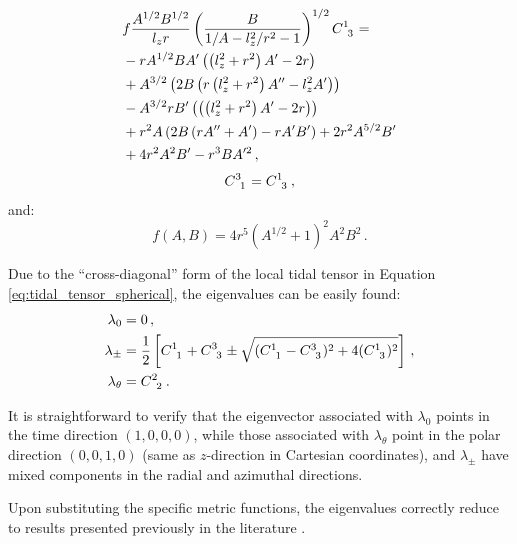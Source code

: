 \documentclass[
    reprint,
    prd,
    nofootinbib,
    amsmath,amssymb,
    aps,
    floatfix,
]{revtex4-2}
\begin{document}
\begin{equation}
    \begin{split}
        &f \frac{A^{1/2}B^{1/2}}{l_{z} r} \left( \frac{B}{1/A - l_{z}^{2}/r^{2} - 1} \right)^{1/2} \tensor{C}{^{1}_{3}} = \\
        &- r A^{1/2} B A' \left( \left( l_{z}^{2} + r^{2} \right) A' - 2 r \right) \\
        &+ A^{3/2} \left( 2 B \left( r \left( l_{z}^{2} + r^{2} \right) A'' - l_{z}^{2} A' \right) \right) \\
        &- A^{3/2} r B' \left( \left( \left( l_{z}^{2} + r^{2} \right) A' - 2 r \right) \right)  \\
        &+ r^{2} A \left( 2 B \left( r A'' + A' \right) - r A' B' \right) + 2 r^{2} A^{5/2} B' \\
        &+ 4 r^{2} A^{2} B' - r^3 B A'^{2} \, ,
    \end{split}
\end{equation}
\begin{equation}
    \tensor{C}{^{3}_{1}} = \tensor{C}{^{1}_{3}} \, ,
\end{equation}
and:
\begin{equation}
    f(A, B) = 4 r^5 \left( A^{1/2} + 1 \right)^{2} A^{2} B^{2} \, .
\end{equation}

Due to the ``cross-diagonal'' form of the local tidal tensor in Equation \ref{eq:tidal_tensor_spherical}, the eigenvalues can be easily found:
\begin{equation}
    \begin{split}
        \lambda_{0} &= 0 \, , \\
        \lambda_{\pm} &= \frac{1}{2} \left[ \tensor{C}{^{1}_{1}} + \tensor{C}{^{3}_{3}} \pm \sqrt{ (\tensor{C}{^{1}_{1}} - \tensor{C}{^{3}_{3}})^{2} + 4 (\tensor{C}{^{1}_{3}})^{2} } \right] \, , \\
        \lambda_{\theta} &= \tensor{C}{^{2}_{2}} \, .
    \end{split}
\end{equation}

It is straightforward to verify that the eigenvector associated with $\lambda_{0}$ points in the time direction $(1, 0, 0, 0)$, while those associated with $\lambda_{\theta}$ point in the polar direction $(0, 0, 1, 0)$ (same as $z$-direction in Cartesian coordinates), and $\lambda_{\pm}$ have mixed components in the radial and azimuthal directions.

Upon substituting the specific metric functions, the eigenvalues correctly reduce to results presented previously in the literature \citep[e.g.,][]{Crispino2016, Sharif2018, Hong2020, Vandeev2021, Vandeev2022, Lima2022, Arora2024}.
\end{document}
